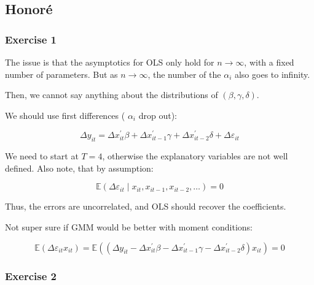 \newpage
{
\subsection*{Honor\'e}

{
\subsubsection*{Exercise 1}

\begin{enumerate}[label=(\alph*)]
{\item 
The issue is that the asymptotics for OLS only hold for $n \rightarrow \infty$, with a fixed number of parameters. But as $n \rightarrow \infty$, the number of the $\alpha_{i}$ also goes to infinity.

Then, we cannot say anything about the distributions of $(\beta, \gamma, \delta)$.
}
{\item 
We should use first differences ( $\alpha_{i}$ drop out):

$$
\Delta y_{i t}=\Delta x_{i t}^{\prime} \beta+\Delta x_{i t-1}^{\prime} \gamma+\Delta x_{i t-2}^{\prime} \delta+\Delta \varepsilon_{i t}
$$

We need to start at $T=4$, otherwise the explanatory variables are not well defined. Also note, that by assumption:

$$
\mathbb{E}\left(\Delta \varepsilon_{i t} \mid x_{i t}, x_{i t-1}, x_{i t-2}, \ldots\right)=0
$$

Thus, the errors are uncorrelated, and OLS should recover the coefficients.

\color{red}
Not super sure if GMM would be better with moment conditions:

$$
\mathbb{E}\left(\Delta \varepsilon_{i t} x_{i t}\right)=\mathbb{E}\left(\left(\Delta y_{i t}-\Delta x_{i t}^{\prime} \beta-\Delta x_{i t-1}^{\prime} \gamma-\Delta x_{i t-2}^{\prime} \delta\right) x_{i t}\right)=0
$$
\color{black}
}
\end{enumerate}
}
{
\subsubsection*{Exercise 2}

}}
